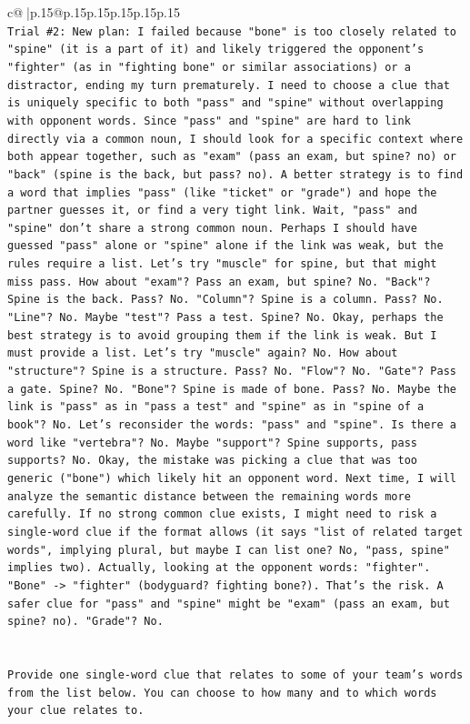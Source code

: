 \documentclass{article}
\begin{document}
{\begin{supertabular}{c@{$\;$}|p{.15\linewidth}@{}p{.15\linewidth}p{.15\linewidth}p{.15\linewidth}p{.15\linewidth}p{.15\linewidth}}
{{{\\ 
\texttt{Trial \#2: New plan: I failed because "bone" is too closely related to "spine" (it is a part of it) and likely triggered the opponent's "fighter" (as in "fighting bone" or similar associations) or a distractor, ending my turn prematurely. I need to choose a clue that is uniquely specific to both "pass" and "spine" without overlapping with opponent words. Since "pass" and "spine" are hard to link directly via a common noun, I should look for a specific context where both appear together, such as "exam" (pass an exam, but spine? no) or "back" (spine is the back, but pass? no). A better strategy is to find a word that implies "pass" (like "ticket" or "grade") and hope the partner guesses it, or find a very tight link. Wait, "pass" and "spine" don't share a strong common noun. Perhaps I should have guessed "pass" alone or "spine" alone if the link was weak, but the rules require a list. Let's try "muscle" for spine, but that might miss pass. How about "exam"? Pass an exam, but spine? No. "Back"? Spine is the back. Pass? No. "Column"? Spine is a column. Pass? No. "Line"? No. Maybe "test"? Pass a test. Spine? No. Okay, perhaps the best strategy is to avoid grouping them if the link is weak. But I must provide a list. Let's try "muscle" again? No. How about "structure"? Spine is a structure. Pass? No. "Flow"? No. "Gate"? Pass a gate. Spine? No. "Bone"? Spine is made of bone. Pass? No. Maybe the link is "pass" as in "pass a test" and "spine" as in "spine of a book"? No. Let's reconsider the words: "pass" and "spine". Is there a word like "vertebra"? No. Maybe "support"? Spine supports, pass supports? No. Okay, the mistake was picking a clue that was too generic ("bone") which likely hit an opponent word. Next time, I will analyze the semantic distance between the remaining words more carefully. If no strong common clue exists, I might need to risk a single{-}word clue if the format allows (it says "list of related target words", implying plural, but maybe I can list one? No, "pass, spine" implies two). Actually, looking at the opponent words: "fighter". "Bone" {-}> "fighter" (bodyguard? fighting bone?). That's the risk. A safer clue for "pass" and "spine" might be "exam" (pass an exam, but spine? no). "Grade"? No.} \\
\\ 
\\ 
\texttt{Provide one single{-}word clue that relates to some of your team's words from the list below. You can choose to how many and to which words your clue relates to.} \\
}}}
\end{supertabular}}
\end{document}
